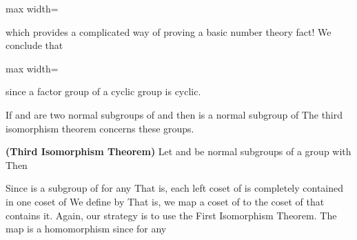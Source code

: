 \documentclass[11pt,oneside]{article}
\begin{document}
\begin{BookBody}

\begin{center}\begin{adjustbox}{max width=\linewidth}\end{adjustbox}\end{center}

\noindent which provides a complicated way of proving a basic number theory fact! We conclude that

\begin{center}\begin{adjustbox}{max width=\linewidth}\end{adjustbox}\end{center}

\noindent since a factor group of a cyclic group is cyclic. \BookEnd{\blacktriangle}

If  and  are two normal subgroups of  and  then  is a normal subgroup of  The third isomorphism theorem concerns these groups.

 \textbf{(Third Isomorphism Theorem)} Let  and  be normal subgroups of a group  with  Then 

 Since  is a subgroup of  for any  That is, each left coset of  is completely contained in one coset of  We define  by  That is, we map a coset of  to the coset of  that contains it. Again, our strategy is to use the First Isomorphism Theorem. The map \BookInline{\phi } is a homomorphism since for any 


\end{BookBody}
\end{document}
